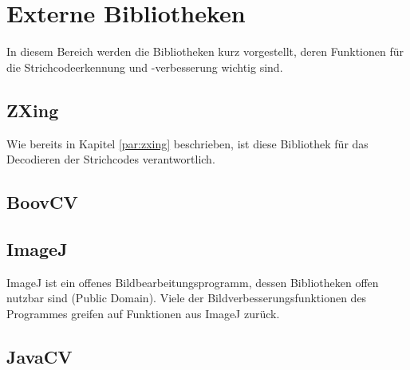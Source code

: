 \section{Externe Bibliotheken}
In diesem Bereich werden die Bibliotheken kurz vorgestellt, deren Funktionen für die Strichcodeerkennung und -verbesserung wichtig sind.


\subsection*{ZXing}
Wie bereits in Kapitel \ref{par:zxing} beschrieben, ist diese Bibliothek für das Decodieren der Strichcodes verantwortlich.


\subsection*{BoovCV}



\subsection*{ImageJ}
ImageJ ist ein offenes Bildbearbeitungsprogramm, dessen Bibliotheken offen nutzbar sind (Public Domain). Viele der Bildverbesserungsfunktionen des Programmes greifen auf Funktionen aus ImageJ zurück.



\subsection*{JavaCV}
